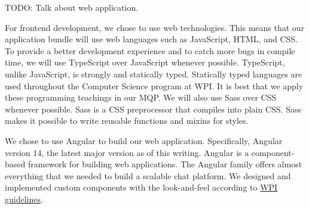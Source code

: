 TODO: Talk about web application.


    For frontend development, we chose to use web technologies.
    This means that our application bundle will use web languages such as JavaScript, HTML, and CSS.
    To provide a better development experience and to catch more bugs in compile time, we will use TypeScript over JavaScript whenever possible.
    TypeScript, unlike JavaScript, is strongly and statically typed.
    Statically typed languages are used throughout the Computer Science program at WPI.
    It is best that we apply these programming teachings in our MQP.
    We will also use Sass over CSS whenever possible.
    Sass is a CSS preprocessor that compiles into plain CSS.
    Sass makes it possible to write reusable functions and mixins for styles.


    We chose to use Angular to build our web application.
    Specifically, Angular version 14, the latest major version as of this writing.
    Angular is a component-based framework for building web applications.
    The Angular family offers almost everything that we needed to build a scalable chat platform.
    We designed and implemented custom components with the look-and-feel according to \hyperref[ch:methodology:sec:conceptual_designs:subsec:wpi_guidelines]{WPI guidelines}.